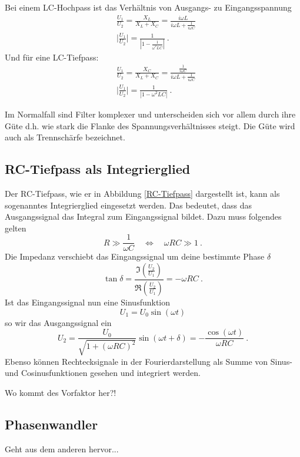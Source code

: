 Bei einem LC-Hochpass ist das Verhältnis von Ausgangs- zu Eingangsspannung
\begin{align}
&\frac{U_1}{U_2} = \frac{X_L}{X_L + X_C} = \frac{i \omega L}{i \omega L+\frac{1}{i \omega C}} \\
& \bigr| \frac{U_1}{U_2} \bigl| = \frac{1}{|1-\frac{1}{ \omega^2 L C}|}\ .
\end{align}
Und für eine LC-Tiefpass:
\begin{align}
&\frac{U_1}{U_2} = \frac{X_C}{X_L + X_C} = \frac{\frac{1}{i \omega C}}{i \omega L+\frac{1}{i \omega C}} \\
& \bigr| \frac{U_1}{U_2} \bigl| = \frac{1}{|1- \omega^2 L C|}\ .
\end{align}

Im Normalfall sind Filter komplexer und unterscheiden sich vor allem durch ihre Güte d.h. wie stark die Flanke des Spannungsverhältnisses steigt. Die Güte wird auch als Trennschärfe bezeichnet.

\subsection{RC-Tiefpass als Integrierglied}
Der RC-Tiefpass, wie er in Abbildung \ref{RC-Tiefpass} dargestellt ist, kann als sogenanntes Integrierglied eingesetzt werden. Das bedeutet, dass das Ausgangssignal das Integral zum Eingangssignal bildet. Dazu muss folgendes gelten
\begin{equation}
R \gg \frac{1}{\omega C} \quad \Leftrightarrow \quad  \omega R C \gg 1 \ .
\end{equation}
Die Impedanz verschiebt das Eingangssignal um deine bestimmte Phase $\delta$
\begin{equation}
\tan \delta = \frac{\Im \left(\frac{U_2}{U_1}\right)}{\Re \left(\frac{U_2}{U_1}\right)} = - \omega R C \ .
\end{equation}
Ist das Eingangssignal nun eine Sinusfunktion
\begin{equation}
U_1 = U_0 \sin(\omega t)
\end{equation}
so wir das Ausgangssignal ein
\begin{equation}
U_2 = \frac{U_0}{\sqrt{1 + (\omega R C)^2}} \sin(\omega t + \delta) = - \frac{\cos{(\omega t)}}{\omega R C} \ .
\end{equation}
Ebenso können Rechtecksignale in der Fourierdarstellung als Summe von Sinus- und Cosinusfunktionen gesehen und integriert werden.

Wo kommt des Vorfaktor her?!

\subsection{Phasenwandler}
Geht aus dem anderen hervor...


		
		